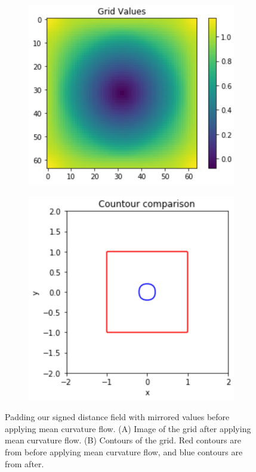 \begin{figure}[H]
	\centering
	\begin{subfigure}[b]{0.45\linewidth}
		\centering
		\includegraphics[width=\linewidth]{Materials/MeanFlow/n1}
		\caption{}
		\label{n1}
	\end{subfigure}
	\hfill
	\begin{subfigure}[b]{0.45\linewidth}
		\centering
		\includegraphics[width=\linewidth]{Materials/MeanFlow/n2}
		\caption{}
		\label{n2}
	\end{subfigure}
	\caption{Padding our signed distance field with mirrored values before applying mean curvature flow. (A) Image of the grid after applying mean curvature flow. (B) Contours of the grid. Red contours are from before applying mean curvature flow, and blue contours are from after.}
	\label{neumann}
\end{figure}
